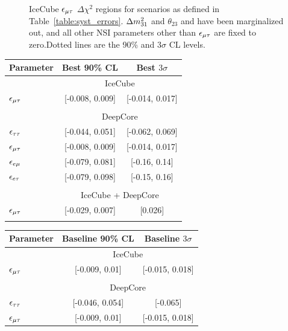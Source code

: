 {\begin{figure}
\begin{center}
      \caption{IceCube $\epsilon_{\mu\tau}$ $\Delta \chi^2$ regions for scenarios as defined in Table~\ref{table:syst_errors}.
    $\dm[31]$ and $\theta_{23}$ and have been marginalized out, and all other NSI 
    parameters other than $\epsilon_{\mu\tau}$ are fixed to zero.Dotted lines are the 90\% and $3\sigma$ CL levels.}\label{fig:IC_3D}
   \end{center}
\end{figure}

{\renewcommand{\arraystretch}{1.0}
 \begin{table}
   \begin{center}
      \begin{tabular}{lcc}
         \hline
         Parameter & Best 90\% CL & Best $3\sigma$\\
         \hline & \multicolumn{2}{c}{IceCube}  \\
         $\epsilon_{\mu\tau}$ &  [-0.008, 0.009] &  [-0.014, 0.017]  \\\\
         & \multicolumn{2}{c}{DeepCore}\\ [0.3em]
         $\epsilon_{\tau\tau}$ &  [-0.044, 0.051] &  [-0.062, 0.069] \\
         $\epsilon_{\mu\tau}$ &  [-0.008, 0.009] &  [-0.014, 0.017] \\
         $\epsilon_{e\mu}$ &  [-0.079, 0.081] &   [-0.16, 0.14] \\
         $\epsilon_{e\tau}$ &  [-0.079, 0.098] &  [-0.15, 0.16] \\\\
         &\multicolumn{2}{c}{IceCube + DeepCore} \\
         $\epsilon_{\mu\tau}$ &  [-0.029, 0.007] &          [0.026] \\
         \hline
         \vspace{2em}
      \end{tabular}
      \begin{tabular}{lcc}
         \hline
         Parameter & Baseline 90\% CL & Baseline $3\sigma$ \\
         \hline & \multicolumn{2}{c}{IceCube}  \\
         $\epsilon_{\mu\tau}$ &  [-0.009, 0.01] &  [-0.015, 0.018]  \\\\
         & \multicolumn{2}{c}{DeepCore}\\ [0.3em]
         $\epsilon_{\tau\tau}$ &    [-0.046, 0.054] &         [-0.065]  \\
         $\epsilon_{\mu\tau}$ &     [-0.009, 0.01] &  [-0.015, 0.018]  \\

\end{tabular}
\end{center}
\end{table}}}

